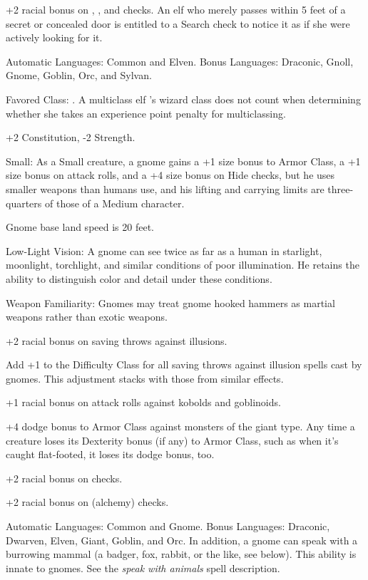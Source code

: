 +2 racial bonus on , , and  checks. An elf who merely passes within 
5 feet of a secret or concealed door is entitled to a Search check to notice it 
as if she were actively looking for it.

Automatic Languages: Common and Elven. Bonus Languages: Draconic, Gnoll, Gnome, 
Goblin, Orc, and Sylvan.

Favored Class: . A multiclass elf 's wizard class does not count when determining 
whether she takes an experience point penalty for multiclassing.


+2 Constitution, -2 Strength.

Small: As a Small creature, a gnome gains a +1 size bonus to Armor Class, a +1 
size bonus on attack rolls, and a +4 size bonus on Hide checks, but he uses smaller 
weapons than humans use, and his lifting and carrying limits are three-quarters 
of those of a Medium character.

Gnome base land speed is 20 feet.

Low-Light Vision: A gnome can see twice as far as a human in starlight, moonlight, 
torchlight, and similar conditions of poor illumination. He retains the ability 
to distinguish color and detail under these conditions.

Weapon Familiarity: Gnomes may treat gnome hooked hammers as martial weapons rather 
than exotic weapons.

+2 racial bonus on saving throws against illusions.

Add +1 to the Difficulty Class for all saving throws against illusion spells cast 
by gnomes. This adjustment stacks with those from similar effects.

+1 racial bonus on attack rolls against kobolds and goblinoids.

+4 dodge bonus to Armor Class against monsters of the giant type. Any time a creature 
loses its Dexterity bonus (if any) to Armor Class, such as when it's caught flat-footed, 
it loses its dodge bonus, too.

+2 racial bonus on  checks.

+2 racial bonus on  (alchemy) checks.

Automatic Languages: Common and Gnome. Bonus Languages: Draconic, Dwarven, Elven, 
Giant, Goblin, and Orc. In addition, a gnome can speak with a burrowing mammal 
(a badger, fox, rabbit, or the like, see below). This ability is innate to gnomes. 
See the \textit{speak with animals }spell description.

